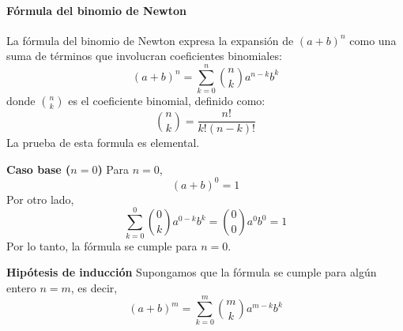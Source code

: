 \documentclass[12pt, a4paper]{article}
\theoremstyle{rioplatense}
\begin{document}
\paragraph{Fórmula del binomio de Newton}
La fórmula del binomio de Newton expresa la expansión de \((a + b)^n\) como una suma de términos que involucran coeficientes binomiales:
\[
(a + b)^n = \sum_{k=0}^n \binom{n}{k} a^{n-k} b^k
\]
donde \(\binom{n}{k}\) es el coeficiente binomial, definido como:
\[
\binom{n}{k} = \frac{n!}{k!(n-k)!}
\]
La prueba de esta formula es elemental.
%
%
%

\textbf{Caso base ($n = 0$)}
Para $n = 0$,
\begin{equation*}
(a + b)^0 = 1
\end{equation*}
Por otro lado,
\begin{equation*}
\sum_{k=0}^{0} \binom{0}{k} a^{0-k} b^k = \binom{0}{0} a^0 b^0 = 1
\end{equation*}
Por lo tanto, la fórmula se cumple para $n = 0$.

\textbf{Hipótesis de inducción}
Supongamos que la fórmula se cumple para algún entero $n = m$, es decir,
\begin{equation*}
(a + b)^m = \sum_{k=0}^{m} \binom{m}{k} a^{m-k} b^k
\end{equation*}
\end{document}
